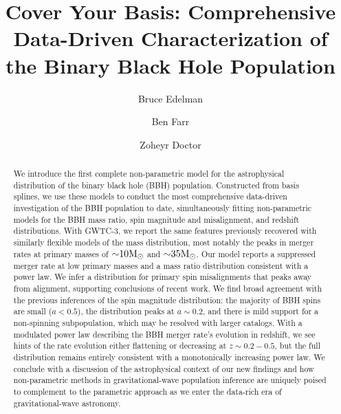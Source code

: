 \documentclass[twocolumn,linenumbers]{aastex631}
\newcommand{\msun}{\ensuremath{{\rm M}_\odot}}
\begin{document}
\title{Cover Your Basis: Comprehensive Data-Driven Characterization of the Binary Black Hole Population}

\author{Bruce Edelman}
\author{Ben Farr}
\author{Zoheyr Doctor}


\begin{abstract}                 
We introduce the first complete non-parametric model for the astrophysical distribution of the binary black hole (BBH) population. Constructed from basis splines, we use these models to conduct the most comprehensive data-driven investigation of the BBH population to date, simultaneously fitting non-parametric models for the BBH mass ratio, spin magnitude and misalignment, and redshift distributions. With GWTC-3, we report the same features previously recovered with similarly flexible models of the mass distribution, most notably the peaks in merger rates at primary masses of ${\sim}10\msun$ and ${\sim}35\msun$. Our model reports a suppressed merger rate at low primary masses and a mass ratio distribution consistent with a power law. We infer a distribution for primary spin misalignments that peaks away from alignment, supporting conclusions of recent work. We find broad agreement with the previous inferences of the spin magnitude distribution: the majority of BBH spins are small ($a<0.5$), the distribution peaks at $a\sim0.2$, and there is mild support for a non-spinning subpopulation, which may be resolved with larger catalogs. With a modulated power law describing the BBH merger rate's evolution in redshift, we see hints of the rate evolution either flattening or decreasing at $z\sim0.2-0.5$, but the full distribution remains entirely consistent with a monotonically increasing power law. We conclude with a discussion of the astrophysical context of our new findings and how non-parametric methods in gravitational-wave population inference are uniquely poised to complement to the parametric approach as we enter the data-rich era of gravitational-wave astronomy.
\end{abstract}


\end{document}
